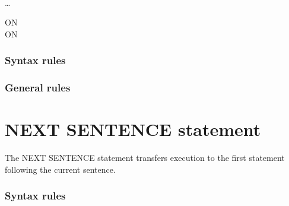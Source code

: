 \begin{syntax}
  \begin{1=}
    \identifier \\
    \literal
  \end{1=}
  \begin{1=}
    \identifier \\
    \literal
  \end{1=}

  \begin{1=}
    \begin{1=}
      \identifier \\
      \literal
    \end{1=}
    \begin{0-1}
    \end{0-1}
  \end{1=} \ldots

  \begin{0+}
    ON   \imperativestatement \\
     ON   \imperativestatement
  \end{0+}

  \begin{0-1}
  \end{0-1}
\end{syntax}

\subsubsection{Syntax rules}

\subsubsection{General rules}

\section{NEXT SENTENCE statement}

The NEXT SENTENCE statement transfers execution to the first statement following the current sentence.

\begin{syntax}[\archaiccolour]
     
\end{syntax}

\subsubsection{Syntax rules}

